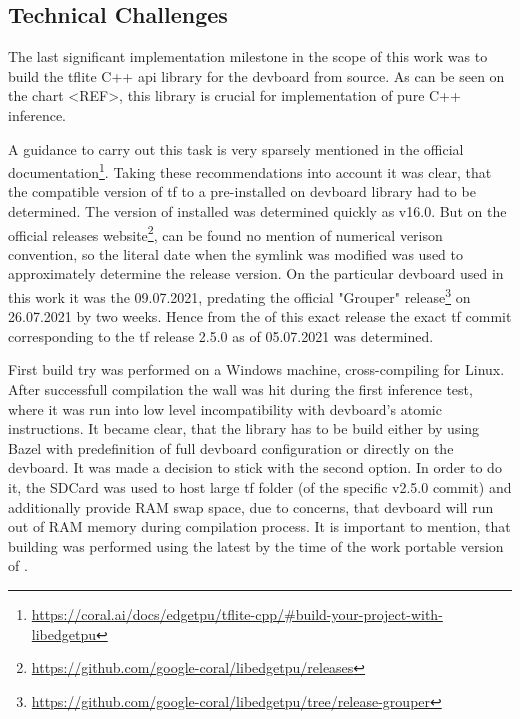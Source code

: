 {\subsection*{Technical Challenges}
\label{subsec:tecchallDeployment}

The last significant implementation milestone in the scope of this work was to build the \gls{tflite} C++ \gls{api} library for the \gls{devboard} from source.
As can be seen on the chart <REF>, this library is crucial for implementation of pure C++ inference.

A guidance to carry out this task is very sparsely mentioned in the official documentation\footnote{\url{https://coral.ai/docs/edgetpu/tflite-cpp/\#build-your-project-with-libedgetpu}}.
Taking these recommendations into account it was clear, that the compatible version of \gls{tf} to a pre-installed on \gls{devboard}  library had to be determined.
The version of installed  was determined quickly as v16.0. But on the official releases website\footnote{\url{https://github.com/google-coral/libedgetpu/releases}},
can be found no mention of numerical verison convention, so the literal date when the symlink  was modified was used to approximately determine the release version.
On the particular \gls{devboard} used in this work it was the 09.07.2021,
predating the official "Grouper"  release\footnote{\url{https://github.com/google-coral/libedgetpu/tree/release-grouper}} on 26.07.2021 by two weeks.
Hence from the  of this exact release the exact \gls{tf} commit corresponding to the \gls{tf} release 2.5.0 as of 05.07.2021 was determined.

First build try was performed on a Windows machine, cross-compiling for  Linux. After successfull compilation the wall was hit during the first inference test,
where it was run into low level incompatibility with \gls{devboard}'s atomic instructions. It became clear, that the library has to be build either by using Bazel with predefinition
of full \gls{devboard} configuration or directly on the \gls{devboard}. It was made a decision to stick with the second option. In order to do it, the SDCard was used to host large
\gls{tf} folder (of the specific v2.5.0 commit) and additionally provide RAM swap space, due to concerns,
that \gls{devboard} will run out of RAM memory during compilation process. It is important to mention,
that building was performed using the latest by the time of the work portable version of . 

}
